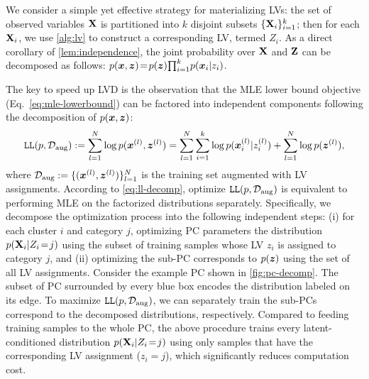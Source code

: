 \documentclass{article} %
\begin{document}
We consider a simple yet effective strategy for materializing LVs: the set of observed variables $\mathbf{X}$ is partitioned into $k$ disjoint subsets $\{\mathbf{X}_i\}_{i=1}^{k}$; then for each $\mathbf{X}_i$, we use \cref{alg:lv} to construct a corresponding LV, termed $Z_i$. As a direct corollary of \cref{lem:independence}, the joint probability over $\mathbf{X}$ and $\mathbf{Z}$ can be decomposed as follows:
${p}(\boldsymbol{x}, \boldsymbol{z}) \!=\! {p}(\boldsymbol{z}) {\prod}_{i=1}^{k} {p}(\boldsymbol{x}_i \vert z_i)$. 

The key to speed up LVD is the observation that the MLE lower bound objective (Eq.~\ref{eq:mle-lowerbound}) can be factored into independent components following the decomposition of ${p}(\boldsymbol{x}, \boldsymbol{z})$:
    \begin{align}
        \mathtt{LL}({p}, \mathcal{D}_{\mathrm{aug}}) := \sum_{l=1}^{N} \log {p}(\boldsymbol{x}^{(l)}, \boldsymbol{z}^{(l)}) = \sum_{l=1}^{N} \sum_{i=1}^{k} \log {p}(\boldsymbol{x}^{(l)}_{i} \vert z^{(l)}_{i}) + \sum_{l=1}^{N} \log {p}(\boldsymbol{z}^{(l)}), \label{eq:ll-decomp}
    \end{align}
\noindent where $\mathcal{D}_{\mathrm{aug}} := \{(\boldsymbol{x}^{(l)}, \boldsymbol{z}^{(l)})\}_{l=1}^{N}$ is the training set augmented with LV assignments. According to \cref{eq:ll-decomp}, optimize $\mathtt{LL}({p}, \mathcal{D}_{\mathrm{aug}})$ is equivalent to performing MLE on the factorized distributions separately. Specifically, we decompose the optimization process into the following independent steps: (i) for each cluster $i$ and category $j$, optimizing PC parameters \wrt the distribution ${p}(\mathbf{X}_i \vert Z_i \!=\! j)$ using the subset of training samples whose LV $z_i$ is assigned to category $j$, and (ii) optimizing the sub-PC corresponds to ${p}(\boldsymbol{z})$ using the set of all LV assignments. Consider the example PC shown in \cref{fig:pc-decomp}. The subset of PC surrounded by every blue box encodes the distribution labeled on its edge. To maximize $\mathtt{LL}({p}, \mathcal{D}_{\mathrm{aug}})$, we can separately train the sub-PCs correspond to the decomposed distributions, respectively. Compared to feeding training samples to the whole PC, the above procedure trains every latent-conditioned distribution ${p}(\mathbf{X}_i \vert Z_i \!=\! j)$ using only samples that have the corresponding LV assignment (\ie $z_i \!=\! j$), which significantly reduces computation cost.
\end{document}
